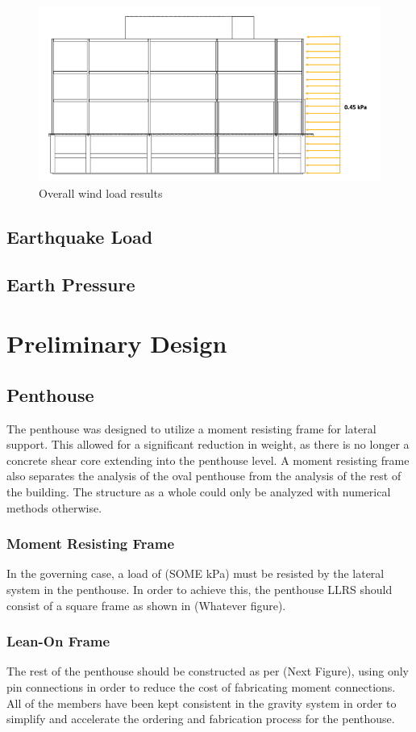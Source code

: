 \documentclass[12pt]{article}
\begin{document}
\begin{figure}[h!]
    \includegraphics[width=\linewidth]{Assets/windload.png}
    \caption{Overall wind load results}
    \label{fig:windload}
\end{figure}

\subsection{Earthquake Load}
\subsection{Earth Pressure}
\section{Preliminary Design}
\subsection{Penthouse}
The penthouse was designed to utilize a moment resisting frame for lateral support. 
This allowed for a significant reduction in weight, as there is no longer a concrete shear core extending into the penthouse level. 
A moment resisting frame also separates the analysis of the oval penthouse from the analysis of the rest of the building. 
The structure as a whole could only be analyzed with numerical methods otherwise.
\subsubsection{Moment Resisting Frame}
In the governing case, a load of (SOME kPa) must be resisted by the lateral system in the penthouse. 
In order to achieve this, the penthouse LLRS should consist of a square frame as shown in (Whatever figure). 
\subsubsection{Lean-On Frame}
The rest of the penthouse should be constructed as per (Next Figure), using only pin connections in order to reduce the cost of fabricating moment connections. 
All of the members have been kept consistent in the gravity system in order to simplify and accelerate the ordering and fabrication process for the penthouse. 
\end{document}
